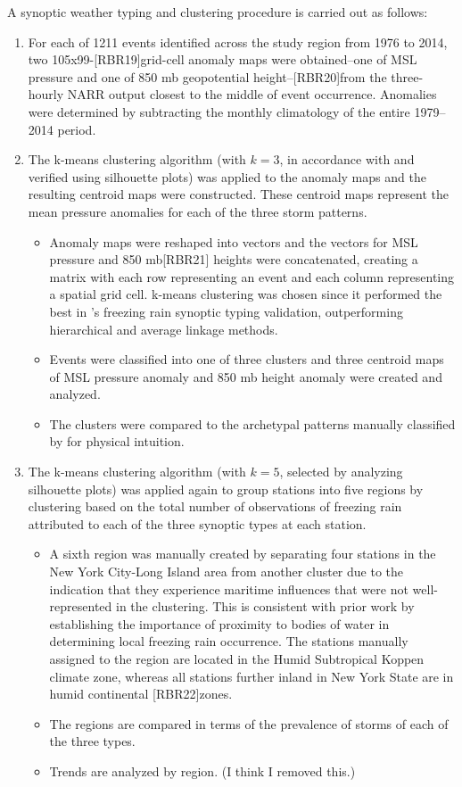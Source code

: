 \documentclass[twocol]{ametsoc}
\begin{document}
A synoptic weather typing and clustering procedure is carried out as follows:
\begin{enumerate}
\item
For each of 1211 events identified across the study region from 1976 to 2014, two 105x99-[RBR19]grid-cell anomaly maps were obtained--one of MSL pressure and one of 850 mb geopotential height--[RBR20]from the three-hourly NARR output closest to the middle of event occurrence. Anomalies were determined by subtracting the monthly climatology of the entire 1979--2014 period. 
\item
The k-means clustering algorithm (with $k=3$, in accordance with \citet{erfani2012automated} and verified using silhouette plots) was applied to the anomaly maps and the resulting centroid maps were constructed. These centroid maps represent the mean pressure anomalies for each of the three storm patterns.
\begin{itemize}
\item
Anomaly maps were reshaped into vectors and the vectors for MSL pressure and 850 mb[RBR21] heights were concatenated, creating a matrix with each row representing an event and each column representing a spatial grid cell. k-means clustering was chosen since it performed the best in \citet{erfani2012automated}'s freezing rain synoptic typing validation, outperforming hierarchical and average linkage methods.
\item
Events were classified into one of three clusters and three centroid maps of MSL pressure anomaly and 850 mb height anomaly were created and analyzed.
\item
The clusters were compared to the archetypal patterns manually classified by \citet{rauber2001synoptic} for physical intuition.
\end{itemize}
\item
The k-means clustering algorithm (with $k=5$, selected by analyzing silhouette plots) was applied again to group stations into five regions by clustering based on the total number of observations of freezing rain attributed to each of the three synoptic types at each station.
\begin{itemize}
\item
A sixth region was manually created by separating four stations in the New York City-Long Island area from another cluster due to the indication that they experience maritime influences that were not well-represented in the clustering. This is consistent with prior work by \citet{bernstein2000regional} establishing the importance of proximity to bodies of water in determining local freezing rain occurrence. The stations manually assigned to the region are located in the Humid Subtropical Koppen climate zone, whereas all stations further inland in New York State are in humid continental [RBR22]zones.
\item
The regions are compared in terms of the prevalence of storms of each of the three types.
\item
Trends are analyzed by region. (I think I removed this.)
\end{itemize}
\end{enumerate}
\end{document}

